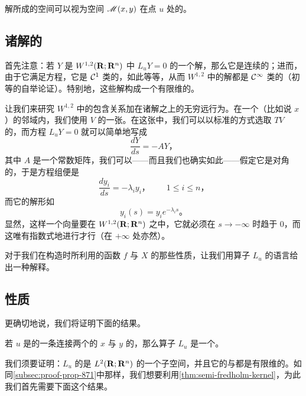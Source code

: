 \begin{remark}\label{thm:solution-space-tangent-space}
解所成的空间可以视为\trTrajectory{}空间 $\mathscr{M}(x,y)$ 在点 $u$ 处的\trTangentSpace。
\end{remark}

\subsection{诸解的\trExponentialDecay}
\label{subsec:exponential-decay-solutions}

首先注意：若 $Y$ 是 $W^{1,2}(\mathbf{R};\mathbf{R}^{n})$ 中 $L_{u}Y=0$ 的一个解，那么它是连续的；进而，由于它满足\trDifferential{}方程，它是 $\mathcal{C}^{1}$ 类的，如此等等，从而 $W^{1,2}$ 中的解都是 $\mathcal{C}^{\infty}$ 类的（初等的自举论证）。特别地，这些解构成一个有限维的\trVectorSpace。

让我们来研究 $W^{1,2}$ 中的包含关系加在诸解之上的无穷远行为。在一个\trCriticalPoint（比如说 $x$）的邻域内，我们使用 $V$ 的一张\trMorseChart。在这张\trChart{}中，我们可以以标准的方式选取 $TV$ 的\trTrivialization，而\trDifferential{}方程 $L_{u}Y=0$ 就可以简单地写成
\[ \frac{dY}{ds}=-AY\text{，} \]
其中 $A$ 是一个常数矩阵，我们可以——而且我们也确实如此——假定它是对角的，于是方程组便是
\[ \frac{dy_{i}}{ds}=-\lambda_{i}y_{i}\text{，}\qquad 1\le i\le n\text{，} \]
而它的解形如
\[ y_{i}(s)=y_{i}e^{-\lambda_{i}s}\text{。} \]
显然，这样一个向量要在 $W^{1,2}(\mathbf{R};\mathbf{R}^{n})$ 之中，它就必须在 $s\to-\infty$ 时趋于 $0$，而这唯有指数式地进行才行（在 $+\infty$ 处亦然）。

对于我们在构造\trMorseComplex{}时所利用的函数 $f$ 与\trVectorField{} $X$ 的那些性质，让我们用算子 $L_{u}$ 的语言给出一种解释。

\subsection{\trFredholm{}性质}
\label{subsec:fredholm-property-lu}

更确切地说，我们将证明下面的结果。

\begin{proposition}\label{thm:lu-fredholm-gradient-trajectory}
若 $u$ 是\trGradient{}的一条连接两个\trNondegenerate{}的\trCriticalPoint{} $x$ 与 $y$ 的\trTrajectory，那么算子 $L_{u}$ 是一个\trFredholmOperator。
\end{proposition}

我们须要证明：$L_{u}$ 的\trImage{}是 $L^{2}(\mathbf{R};\mathbf{R}^{n})$ 的一个\trClosed{}子空间，并且它的\trKernel{}与\trCokernel{}都是有限维的。如同\cref{subsec:proof-prop-871}中那样，我们想要利用\cref{thm:semi-fredholm-kernel}，为此我们首先需要下面这个结果。

